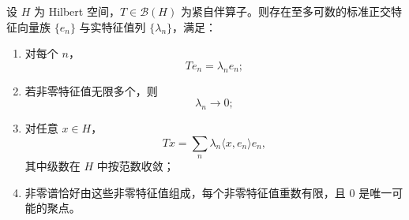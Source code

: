 \begin{theorem}[紧自伴算子的谱定理]\label{thm:compact-selfadjoint-spectral}
设 $H$ 为 Hilbert 空间，$T\in \mathcal B(H)$ 为紧自伴算子。则存在至多可数的标准正交特征向量族 $\{e_n\}$ 与实特征值列 $\{\lambda_n\}$，满足：
\begin{enumerate}
  \item 对每个 $n$，
  \[
  Te_n=\lambda_n e_n;
  \]
  \item 若非零特征值无限多个，则
  \[
  \lambda_n\to 0;
  \]
  \item 对任意 $x\in H$，
  \[
  Tx=\sum_{n} \lambda_n \langle x,e_n\rangle e_n,
  \]
  其中级数在 $H$ 中按范数收敛；
  \item 非零谱恰好由这些非零特征值组成，每个非零特征值重数有限，且 $0$ 是唯一可能的聚点。
\end{enumerate}
\end{theorem}

